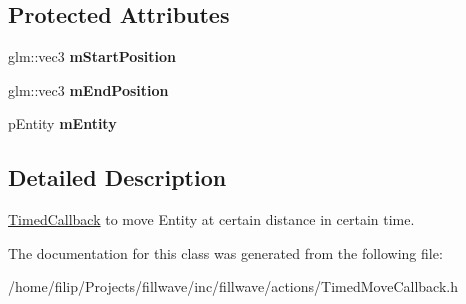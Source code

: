 \subsection*{Protected Attributes}
\begin{DoxyCompactItemize}
\item 
\hypertarget{classfillwave_1_1actions_1_1TimedMoveCallback_ad52fbebb19ba90890f39de579496a5b7}{}glm\+::vec3 {\bfseries m\+Start\+Position}\label{classfillwave_1_1actions_1_1TimedMoveCallback_ad52fbebb19ba90890f39de579496a5b7}

\item 
\hypertarget{classfillwave_1_1actions_1_1TimedMoveCallback_a6a11cdcdfccb6297104fda7232e5aef5}{}glm\+::vec3 {\bfseries m\+End\+Position}\label{classfillwave_1_1actions_1_1TimedMoveCallback_a6a11cdcdfccb6297104fda7232e5aef5}

\item 
\hypertarget{classfillwave_1_1actions_1_1TimedMoveCallback_a46ca99eaf5b6f41f02004ce2cd1112d8}{}p\+Entity {\bfseries m\+Entity}\label{classfillwave_1_1actions_1_1TimedMoveCallback_a46ca99eaf5b6f41f02004ce2cd1112d8}

\end{DoxyCompactItemize}


\subsection{Detailed Description}
\hyperlink{classfillwave_1_1actions_1_1TimedCallback}{Timed\+Callback} to move Entity at certain distance in certain time. 

The documentation for this class was generated from the following file\+:\begin{DoxyCompactItemize}
\item 
/home/filip/\+Projects/fillwave/inc/fillwave/actions/Timed\+Move\+Callback.\+h\end{DoxyCompactItemize}
